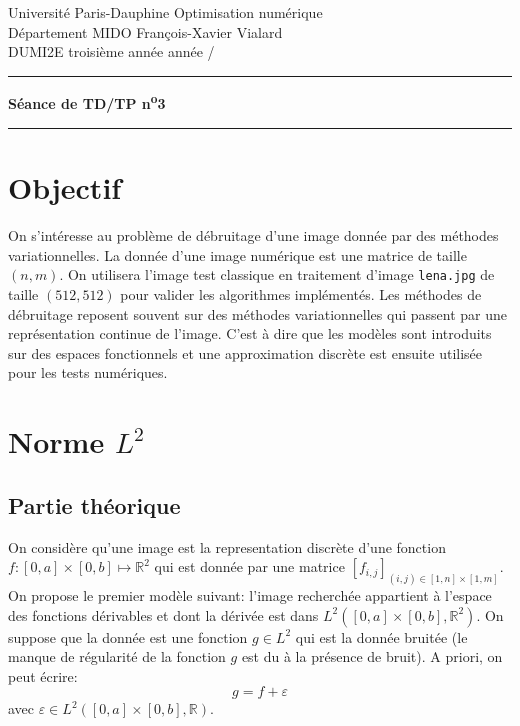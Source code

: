 \documentclass[10pt,a4paper,fleqn]{report}
\makeatletter
\def\cleardoublepage{\clearpage\if@twoside\ifodd\c@page\else\hbox{}\thispagestyle{empty}\newpage\fi\fi}
\newcommand{\R}{\mathbb R}
\makeatother
\begin{document}
\cleardoublepage

\noindent
Universit\'e Paris-Dauphine     \hfill      Optimisation num\'erique\\
D\'epartement MIDO              \hfill      François-Xavier Vialard\\
DUMI2E troisi\`eme ann\'ee      \hfill      ann\'ee /

\medskip

\hrule

\medskip

\begin{center}

\textbf{\huge S\'{e}ance de TD/TP n\textsuperscript{o}3}

\smallskip

\rule{10cm}{0.4pt}

\end{center}


\section*{Objectif}
On s'int\'eresse au probl\`eme de d\'ebruitage d'une image donn\'ee
par des m\'ethodes variationnelles. La donn\'ee d'une image
num\'erique est une matrice de taille $(n,m)$. On utilisera l'image
test classique en traitement d'image \texttt{lena.jpg} de taille
$(512,512)$ pour valider les algorithmes impl\'ement\'es. Les
m\'ethodes de d\'ebruitage reposent souvent sur des m\'ethodes
variationnelles qui passent par une repr\'esentation continue de
l'image. C'est \`a dire que les mod\`eles sont introduits sur des
espaces fonctionnels et une approximation discr\`ete est ensuite
utilis\'ee pour les tests num\'eriques.


\section{Norme $L^{2}$}
\subsection{Partie théorique}
On consid\`ere qu'une image est la representation discr\`ete d'une fonction $f:[0,a]\times[0,b] \mapsto \R^2$ qui est donn\'ee par une matrice $[f_{i,j}]_{(i,j)\in [1,n]\times[1,m]}$.
On propose le premier mod\`ele suivant: l'image recherch\'ee appartient \`a l'espace des fonctions d\'erivables et dont la d\'eriv\'ee est dans $L^2([0,a]\times[0,b],\R^2)$. On suppose que la donn\'ee est une fonction $g \in L^2$ qui est la donn\'ee bruit\'ee (le manque de r\'egularit\'e de la fonction $g$ est du \`a la pr\'esence de bruit). A priori, on peut \'ecrire:
\begin{equation}
g = f+ \varepsilon 
\end{equation}
avec $\varepsilon \in L^2([0,a]\times[0,b],\R) $.
\end{document}
